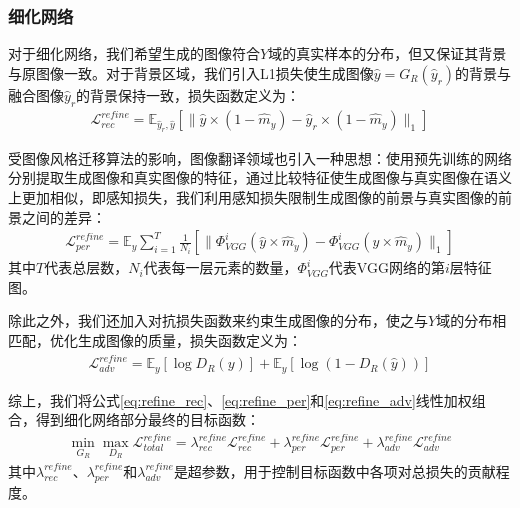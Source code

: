 \subsubsection{细化网络}

对于细化网络，我们希望生成的图像符合$Y$域的真实样本的分布，但又保证其背景与原图像一致。对于背景区域，我们引入L1损失使生成图像$\hat{y}=G_R(\hat{y}_r)$的背景与融合图像$\hat{y}_r$的背景保持一致，损失函数定义为：
\begin{equation}
\begin{split}
\mathcal{L}_{rec}^{refine}=\mathbb{E}_{\hat{y}_r, \hat{y}}[\parallel \hat{y}\times(1-\hat{m}_y)-\hat{y}_r\times(1-\hat{m}_y)\parallel_1]
\end{split}
\label{eq:refine_rec}
\end{equation}

受图像风格迁移算法的影响，图像翻译领域也引入一种思想：使用预先训练的网络分别提取生成图像和真实图像的特征，通过比较特征使生成图像与真实图像在语义上更加相似，即感知损失\cite{johnson2016perceptual}，我们利用感知损失限制生成图像的前景与真实图像的前景之间的差异：
\begin{equation}
\begin{split}
\mathcal{L}_{per}^{refine}=\mathbb{E}_{y}\sum_{i=1}^{T}\frac{1}{N_i}[\parallel\Phi_{VGG}^i(\hat{y}\times\hat{m}_y)-\Phi_{VGG}^i(y\times\hat{m}_y)\parallel_1]
\end{split}
\label{eq:refine_per}
\end{equation}
其中$T$代表总层数，$N_i$代表每一层元素的数量，$\Phi_{VGG}^i$代表VGG网络的第$i$层特征图。

除此之外，我们还加入对抗损失函数来约束生成图像的分布，使之与$Y$域的分布相匹配，优化生成图像的质量，损失函数定义为：
\begin{equation}
\begin{split}
\mathcal{L}_{adv}^{refine}=\mathbb{E}_y[\log D_R(y)] + \mathbb{E}_y[\log(1-D_R(\hat{y}))] 
\end{split}
\label{eq:refine_adv}
\end{equation}

综上，我们将公式\ref{eq:refine_rec}、\ref{eq:refine_per}和\ref{eq:refine_adv}线性加权组合，得到细化网络部分最终的目标函数：
\begin{equation}
\begin{split}
\min \limits_{G_R} \max \limits_{D_R} \mathcal{L}_{total}^{refine}=\lambda_{rec}^{refine}\mathcal{L}_{rec}^{refine}+\lambda_{per}^{refine}\mathcal{L}_{per}^{refine}+\lambda_{adv}^{refine}\mathcal{L}_{adv}^{refine}
\end{split}
\label{eq:refine_total}
\end{equation}
其中$\lambda_{rec}^{refine}$、$\lambda_{per}^{refine}$和$\lambda_{adv}^{refine}$是超参数，用于控制目标函数中各项对总损失的贡献程度。

